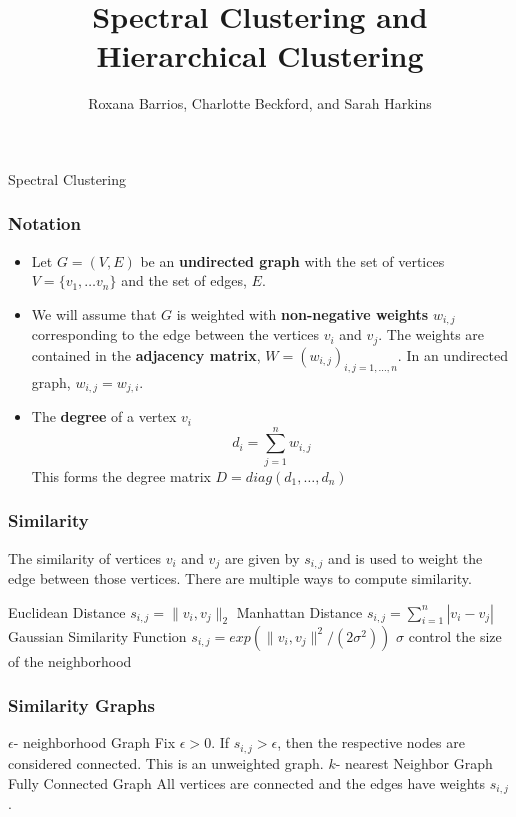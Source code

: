 \documentclass{beamer}
\title[Spectral and Hierarchical Clustering]{Spectral Clustering and Hierarchical Clustering}
\author{Roxana Barrios, Charlotte Beckford, and Sarah Harkins}
\institute{Math 526}
\begin{document}
\begin{frame}
\titlepage
\end{frame}

\begin{frame}
\begin{center}
  \textcolor{TennesseeOrange}{\huge Spectral Clustering}  
\end{center}

\end{frame}

\begin{frame}
\frametitle{Notation}

\begin{itemize}
    \item Let $G = (V,E)$ be an \textbf{undirected graph} with the set of vertices $V = \{ v_1, \dots v_n\}$ and the set of edges, $E$.  
    \item We will assume that $G$ is weighted with \textbf{non-negative weights} $w_{i,j}$ corresponding to the edge between the vertices $v_i$ and $v_j$. The weights are contained in the \textbf{adjacency matrix}, $W = (w_{i,j})_{i,j = 1, \dots , n}$. In an undirected graph, $w_{i,j} = w_{j,i}$. 
    \item The \textbf{degree} of a vertex $v_i$  $$d_i = \sum_{j=1}^{n} w_{i,j}$$ This forms the degree matrix $D= diag(d_1, \dots , d_n)$
\end{itemize}

\end{frame}

\begin{frame}
\frametitle{Similarity}
The similarity of vertices $v_i$ and $v_j$ are given by $s_{i,j}$ and is used to weight the edge between those vertices. There are multiple ways to compute similarity. 

\begin{outline}
    \1 Euclidean Distance
        \2 $s_{i,j} = \| v_i, v_j\|_2$
    \1 Manhattan Distance
        \2 $s_{i,j} = \sum_{i=1}^{n} | v_i - v_j|$
    \1 Gaussian Similarity Function
        \2 $s_{i,j} = exp(\| v_i, v_j\|^2 / (2\sigma^2))$
            \3 $\sigma$ control the size of the neighborhood 
\end{outline}

\end{frame}

\begin{frame}
\frametitle{Similarity Graphs}


\begin{outline}
    \1 $\epsilon$- neighborhood Graph
        \2 Fix $\epsilon >0$. If  $s_{i,j} > \epsilon$, then the respective nodes are considered connected. This is an unweighted graph. 
    \1 $k$- nearest Neighbor Graph
        \2 
    \1 Fully Connected Graph
        \2 All vertices are connected and the edges have weights $s_{i,j}$. 
\end{outline}



\end{frame}
\end{document}
